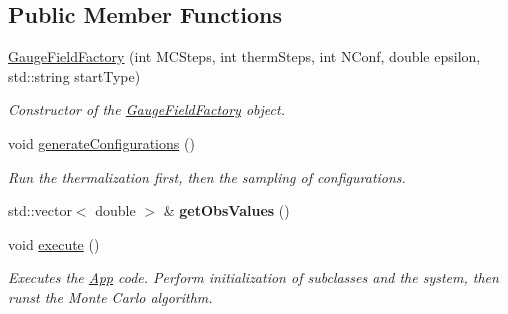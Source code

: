 \subsection*{Public Member Functions}
\begin{DoxyCompactItemize}
\item 
\hyperlink{classGaugeFieldFactory_ab4de95086757f8dad2bb82225990798c}{Gauge\+Field\+Factory} (int M\+C\+Steps, int therm\+Steps, int N\+Conf, double epsilon, std\+::string start\+Type)\hypertarget{classGaugeFieldFactory_ab4de95086757f8dad2bb82225990798c}{}\label{classGaugeFieldFactory_ab4de95086757f8dad2bb82225990798c}

\begin{DoxyCompactList}\small\item\em Constructor of the \hyperlink{classGaugeFieldFactory}{Gauge\+Field\+Factory} object. \end{DoxyCompactList}\item 
void \hyperlink{classGaugeFieldFactory_a44af20883686c17d5cc02b0017981a00}{generate\+Configurations} ()\hypertarget{classGaugeFieldFactory_a44af20883686c17d5cc02b0017981a00}{}\label{classGaugeFieldFactory_a44af20883686c17d5cc02b0017981a00}

\begin{DoxyCompactList}\small\item\em Run the thermalization first, then the sampling of configurations. \end{DoxyCompactList}\item 
std\+::vector$<$ double $>$ \& {\bfseries get\+Obs\+Values} ()\hypertarget{classGaugeFieldFactory_a3455c32bf0d8e97c5b20a6372b108a42}{}\label{classGaugeFieldFactory_a3455c32bf0d8e97c5b20a6372b108a42}

\item 
void \hyperlink{classGaugeFieldFactory_ae71b983ead390226ddad5d0f13aba0c6}{execute} ()\hypertarget{classGaugeFieldFactory_ae71b983ead390226ddad5d0f13aba0c6}{}\label{classGaugeFieldFactory_ae71b983ead390226ddad5d0f13aba0c6}

\begin{DoxyCompactList}\small\item\em Executes the \hyperlink{classApp}{App} code. Perform initialization of subclasses and the system, then runst the Monte Carlo algorithm. \end{DoxyCompactList}\end{DoxyCompactItemize}
